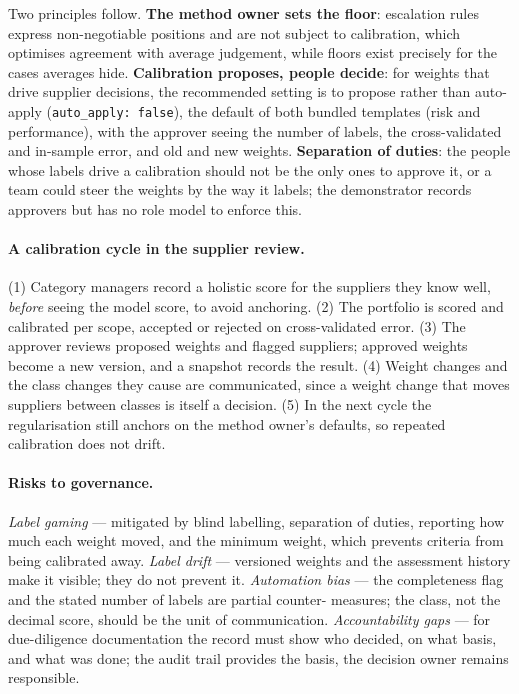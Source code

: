 \documentclass[10pt,twocolumn,a4paper]{article}
\newcommand{\code}[1]{{\small\texttt{#1}}}
\begin{document}
Two principles follow. \textbf{The method owner sets the floor}: escalation rules express
non-negotiable positions and are not subject to calibration, which optimises agreement
with average judgement, while floors exist precisely for the cases averages hide.
\textbf{Calibration proposes, people decide}: for weights that drive supplier decisions,
the recommended setting is to propose rather than auto-apply (\code{auto\_apply: false}),
the default of both bundled templates (risk and performance),
with the approver seeing
the number of labels, the cross-validated and in-sample error, and old and new weights.
\textbf{Separation of duties}: the people whose labels drive a calibration should not be
the only ones to approve it, or a team could steer the weights by the way it labels; the
demonstrator records approvers but has no role model to enforce this.

\paragraph{A calibration cycle in the supplier review.} (1) Category managers record a
holistic score for the suppliers they know well, \emph{before} seeing the model score, to
avoid anchoring. (2) The portfolio is scored and calibrated per scope, accepted or
rejected on cross-validated error. (3) The approver reviews proposed weights and flagged
suppliers; approved weights become a new version, and a snapshot records the result. (4)
Weight changes and the class changes they cause are communicated, since a weight change
that moves suppliers between classes is itself a decision. (5) In the next cycle the
regularisation still anchors on the method owner's defaults, so repeated calibration does
not drift.

\paragraph{Risks to governance.} \emph{Label gaming} --- mitigated by blind labelling,
separation of duties, reporting how much each weight moved, and the minimum weight, which
prevents criteria from being calibrated away. \emph{Label drift} --- versioned weights
and the assessment history make it visible; they do not prevent it. \emph{Automation
bias} --- the completeness flag and the stated number of labels are partial counter-
measures; the class, not the decimal score, should be the unit of communication.
\emph{Accountability gaps} --- for due-diligence documentation the record must show who
decided, on what basis, and what was done; the audit trail provides the basis, the
decision owner remains responsible.
\end{document}
